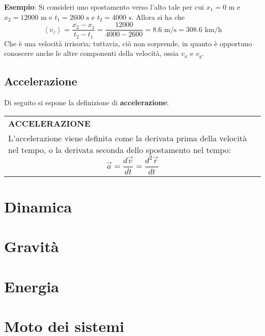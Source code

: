 \documentclass[a4paper]{extarticle}
\renewcommand\arraystretch{}
\begin{document}
\vspace{1em}
\noindent
\textbf{Esempio}: Si consideri uno spostamento verso l'alto tale per cui $x_1 = 0 \text{ m}$ e $x_2 = 12000 \text{ m}$ e $t_1 = 2600 \text{ s}$ e $t_2 = 4000 \text{ s}$. Allora si ha che
\[\left<v_z\right> = \frac{x_2 - x_1}{t_2 - t_1} = \frac{12000}{4000 - 2600} = 8.6 \text{ m/s} = 308.6 \text{ km/h}\]
Che è una velocità irrisoria; tuttavia, ciò non sorprende, in quanto è opportuno conoscere anche le altre componenti della velocità, ossia $v_x$ e $v_y$.

\vspace{1em}
\subsection{Accelerazione}
Di seguito si espone la definizione di \textbf{accelerazione}:

\vspace{1em}
\setlength{\tabcolsep}{14pt}
\renewcommand{\arraystretch}{2}
\noindent
\begin{tabularx}{\textwidth}{@{}|P|@{}}
    \hline
    {\textbf{ACCELERAZIONE}}\\
    \parbox{\linewidth}{L'accelerazione viene definita come la derivata prima della velocità nel tempo, o la derivata seconda dello spostamento nel tempo:
    \[\vec{a} = \frac{d \vec{v}}{dt} = \frac{d^2 \vec{r}}{dt}\]
    \vspace{3mm}}\\
    \hline
\end{tabularx}








\newpage
\section{Dinamica}

\newpage
\section{Gravità}

\newpage
\section{Energia}

\newpage
\section{Moto dei sistemi}
\end{document}

